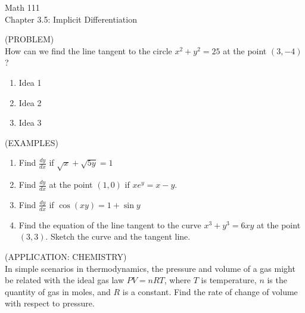 \documentclass[11pt]{article}
\begin{document}
\begin{center}
\Large
\rm{Math 111}
\\
\rm{Chapter 3.5:  Implicit Differentiation}
\\
\end{center}
\vspace{0.2in}

(PROBLEM)\\
How can we find the line tangent to the circle $x^2+ y^2 = 25$ at the point $(3,-4)$?

\vspace{0.1in}

\begin{enumerate}
\item{Idea 1}

  \vspace{2in}
\item{Idea 2}
  
  \vspace{2in}
  
\item{Idea 3}
  
  \vspace{2.5in}
  
  \end{enumerate}

\pagebreak

(EXAMPLES) 

\begin{enumerate}
  \item{Find $\frac{dy}{dx}$ if $\sqrt{x}+\sqrt{5y} = 1$}
  \vspace{2in}
\item{Find $\frac{dy}{dx}$ at the point $(1,0)$ if $xe^y=x-y$.}
  \vspace{2in}
  \item{Find $\frac{dy}{dx}$ if $\cos(xy)=1+\sin{y}$}
  \vspace{2in}

  \pagebreak
  
\item{Find the equation of the line tangent to the curve $x^3+y^3=6xy$ at the point $(3,3)$.  Sketch the curve and the tangent line.}

  \end{enumerate}

\vspace{3in}
(APPLICATION:  CHEMISTRY) \\

In simple scenarios in thermodynamics, the pressure and volume of a gas might be related with the ideal gas law  $PV = nRT$, where $T$ is
temperature, $n$ is the quantity of gas in moles, and $R$ is a constant.  Find the rate of change of volume with respect to pressure.
\end{document}
